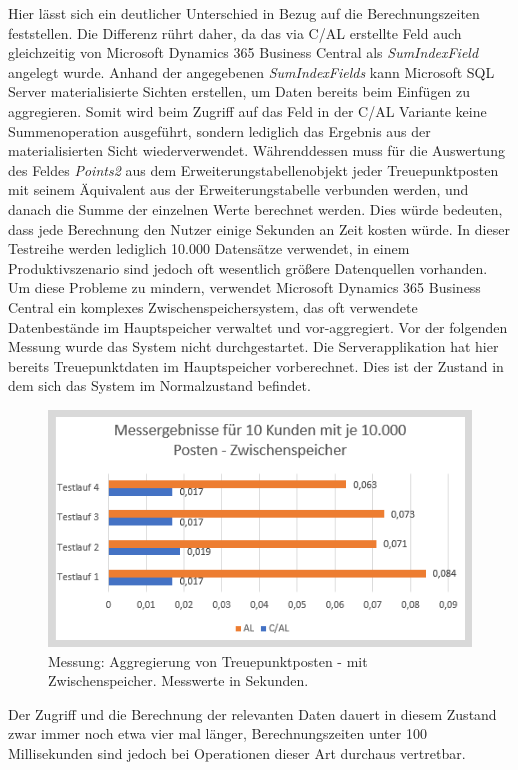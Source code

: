 Hier lässt sich ein deutlicher Unterschied in Bezug auf die Berechnungszeiten feststellen. Die Differenz rührt daher, da das via C/AL erstellte Feld auch gleichzeitig von Microsoft Dynamics 365 Business Central als \textit{SumIndexField} angelegt wurde. Anhand der angegebenen \textit{SumIndexFields} kann Microsoft SQL Server materialisierte Sichten erstellen, um Daten bereits beim Einfügen zu aggregieren. Somit wird beim Zugriff auf das Feld in der C/AL Variante keine Summenoperation ausgeführt, sondern lediglich das Ergebnis aus der materialisierten Sicht wiederverwendet. Währenddessen muss für die Auswertung des Feldes \textit{Points2} aus dem Erweiterungstabellenobjekt jeder Treuepunktposten mit seinem Äquivalent aus der Erweiterungstabelle verbunden werden, und danach die Summe der einzelnen Werte berechnet werden. Dies würde bedeuten, dass jede Berechnung den Nutzer einige Sekunden an Zeit kosten würde. In dieser Testreihe werden lediglich 10.000 Datensätze verwendet, in einem Produktivszenario sind jedoch oft wesentlich größere Datenquellen vorhanden. Um diese Probleme zu mindern, verwendet Microsoft Dynamics 365 Business Central ein komplexes Zwischenspeichersystem, das oft verwendete Datenbestände im Hauptspeicher verwaltet und vor-aggregiert. 
Vor der folgenden Messung wurde das System nicht durchgestartet. Die Serverapplikation hat hier bereits Treuepunktdaten im Hauptspeicher vorberechnet. Dies ist der Zustand in dem sich das System im Normalzustand befindet.
\begin{figure}[H]
	\centering
	\includegraphics[width=130mm]{images/Test2Cache}
	\caption{Messung: Aggregierung von Treuepunktposten - mit Zwischenspeicher. Messwerte in Sekunden.}
	\label{fig:Test2Schema}
\end{figure}

Der Zugriff und die Berechnung der relevanten Daten dauert in diesem Zustand zwar immer noch etwa vier mal länger, Berechnungszeiten unter 100 Millisekunden sind jedoch bei Operationen dieser Art durchaus vertretbar.

